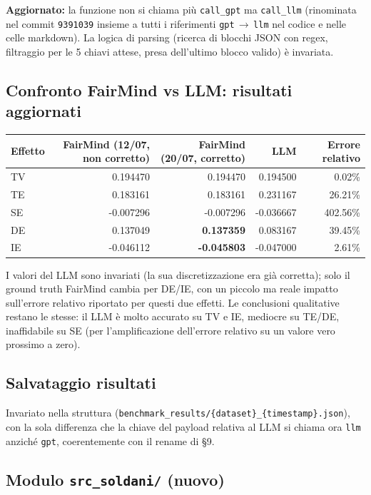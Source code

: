 \textbf{Aggiornato:} la funzione non si chiama pi\`u \texttt{call\_gpt} ma \texttt{call\_llm} (rinominata nel commit \texttt{9391039} insieme a tutti i riferimenti \texttt{gpt}\,$\to$\,\texttt{llm} nel codice e nelle celle markdown). La logica di parsing (ricerca di blocchi JSON con regex, filtraggio per le 5 chiavi attese, presa dell'ultimo blocco valido) \`e invariata.

\subsection{Confronto FairMind vs LLM: risultati aggiornati}
\label{sec:risultati}

\begin{center}
\begin{tabular}{lrrrr}
\toprule
Effetto & FairMind (12/07, non corretto) & FairMind (20/07, corretto) & LLM & Errore relativo \\
\midrule
TV & 0.194470 & 0.194470 & 0.194500 & 0.02\% \\
TE & 0.183161 & 0.183161 & 0.231167 & 26.21\% \\
SE & -0.007296 & -0.007296 & -0.036667 & 402.56\% \\
DE & 0.137049 & \textbf{0.137359} & 0.083167 & 39.45\% \\
IE & -0.046112 & \textbf{-0.045803} & -0.047000 & 2.61\% \\
\bottomrule
\end{tabular}
\end{center}

I valori del LLM sono invariati (la sua discretizzazione era gi\`a corretta); solo il ground truth FairMind cambia per DE/IE, con un piccolo ma reale impatto sull'errore relativo riportato per questi due effetti. Le conclusioni qualitative restano le stesse: il LLM \`e molto accurato su TV e IE, mediocre su TE/DE, inaffidabile su SE (per l'amplificazione dell'errore relativo su un valore vero prossimo a zero).

\subsection{Salvataggio risultati}

Invariato nella struttura (\texttt{benchmark\_results/\{dataset\}\_\{timestamp\}.json}), con la sola differenza che la chiave del payload relativa al LLM si chiama ora \texttt{llm} anzich\'e \texttt{gpt}, coerentemente con il rename di \S 9.

\subsection{Modulo \texttt{src\_soldani/} (nuovo)}


